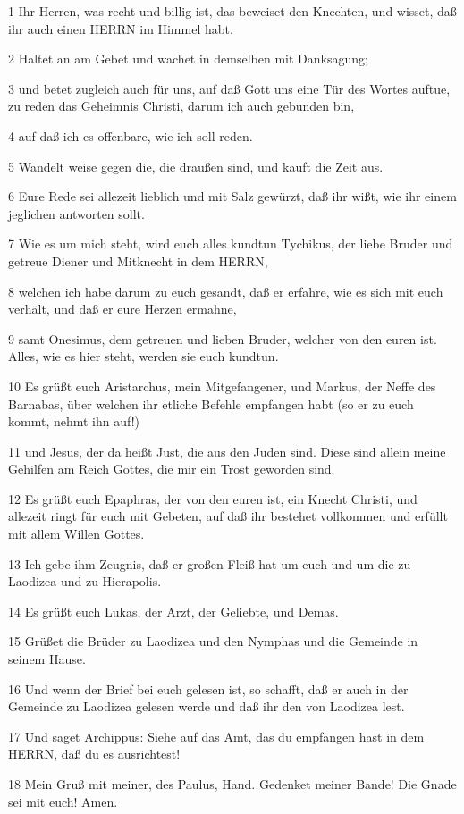 \par 1 Ihr Herren, was recht und billig ist, das beweiset den Knechten, und wisset, daß ihr auch einen HERRN im Himmel habt.
\par 2 Haltet an am Gebet und wachet in demselben mit Danksagung;
\par 3 und betet zugleich auch für uns, auf daß Gott uns eine Tür des Wortes auftue, zu reden das Geheimnis Christi, darum ich auch gebunden bin,
\par 4 auf daß ich es offenbare, wie ich soll reden.
\par 5 Wandelt weise gegen die, die draußen sind, und kauft die Zeit aus.
\par 6 Eure Rede sei allezeit lieblich und mit Salz gewürzt, daß ihr wißt, wie ihr einem jeglichen antworten sollt.
\par 7 Wie es um mich steht, wird euch alles kundtun Tychikus, der liebe Bruder und getreue Diener und Mitknecht in dem HERRN,
\par 8 welchen ich habe darum zu euch gesandt, daß er erfahre, wie es sich mit euch verhält, und daß er eure Herzen ermahne,
\par 9 samt Onesimus, dem getreuen und lieben Bruder, welcher von den euren ist. Alles, wie es hier steht, werden sie euch kundtun.
\par 10 Es grüßt euch Aristarchus, mein Mitgefangener, und Markus, der Neffe des Barnabas, über welchen ihr etliche Befehle empfangen habt (so er zu euch kommt, nehmt ihn auf!)
\par 11 und Jesus, der da heißt Just, die aus den Juden sind. Diese sind allein meine Gehilfen am Reich Gottes, die mir ein Trost geworden sind.
\par 12 Es grüßt euch Epaphras, der von den euren ist, ein Knecht Christi, und allezeit ringt für euch mit Gebeten, auf daß ihr bestehet vollkommen und erfüllt mit allem Willen Gottes.
\par 13 Ich gebe ihm Zeugnis, daß er großen Fleiß hat um euch und um die zu Laodizea und zu Hierapolis.
\par 14 Es grüßt euch Lukas, der Arzt, der Geliebte, und Demas.
\par 15 Grüßet die Brüder zu Laodizea und den Nymphas und die Gemeinde in seinem Hause.
\par 16 Und wenn der Brief bei euch gelesen ist, so schafft, daß er auch in der Gemeinde zu Laodizea gelesen werde und daß ihr den von Laodizea lest.
\par 17 Und saget Archippus: Siehe auf das Amt, das du empfangen hast in dem HERRN, daß du es ausrichtest!
\par 18 Mein Gruß mit meiner, des Paulus, Hand. Gedenket meiner Bande! Die Gnade sei mit euch! Amen.


